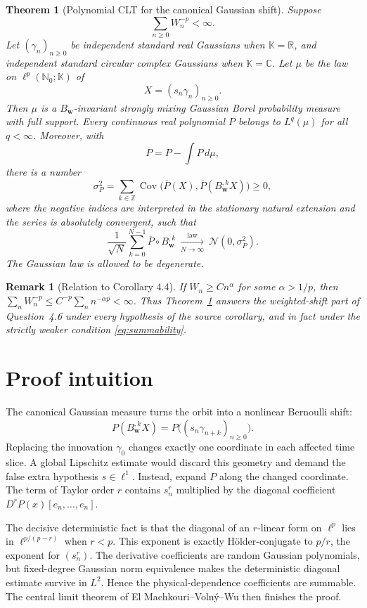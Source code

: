 \documentclass[11pt]{article}
\newtheorem{theorem}{Theorem}
\newtheorem{remark}{Remark}
\newcommand{\N}{\mathbb N}
\newcommand{\R}{\mathbb R}
\newcommand{\K}{\mathbb K}
\newcommand{\ellp}{\ell^p(\N_0;\K)}
\begin{document}
\begin{theorem}[Polynomial CLT for the canonical Gaussian shift]\label{thm:main}
Suppose
\begin{equation}\label{eq:summability}
 \sum_{n\ge0} W_n^{-p}<\infty.
\end{equation}
Let $(\gamma_n)_{n\ge0}$ be independent standard real Gaussians when $\K=\R$, and independent standard circular complex Gaussians when $\K=\mathbb C$.  Let $\mu$ be the law on $\ellp$ of
\[
 X=(s_n\gamma_n)_{n\ge0}.
\]
Then $\mu$ is a $B_{\mathbf w}$-invariant strongly mixing Gaussian Borel probability measure with full support.  Every continuous real polynomial $P$ belongs to $L^q(\mu)$ for all $q<\infty$.  Moreover, with
\[
 \overline P=P-\int P\,d\mu,
\]
there is a number
\[
 \sigma_P^2=\sum_{k\in\mathbb Z}\operatorname{Cov}
 \bigl(\overline P(X),\overline P(B_{\mathbf w}^{,k}X)\bigr)\ge0,
\]
where the negative indices are interpreted in the stationary natural extension and the series is absolutely convergent, such that
\[
 \frac1{\sqrt N}\sum_{k=0}^{N-1}\overline P\circ B_{\mathbf w}^{,k}
 \ \xrightarrow[N\to\infty]{\mathrm{law}}\ \mathcal N(0,\sigma_P^2).
\]
The Gaussian law is allowed to be degenerate.
\end{theorem}

\begin{remark}[Relation to Corollary 4.4]
If $W_n\ge Cn^\alpha$ for some $\alpha>1/p$, then
$\sum_nW_n^{-p}\le C^{-p}\sum_n n^{-\alpha p}<\infty$.  Thus Theorem~\ref{thm:main} answers the weighted-shift part of Question~4.6 under every hypothesis of the source corollary, and in fact under the strictly weaker condition \eqref{eq:summability}.
\end{remark}

\section{Proof intuition}

The canonical Gaussian measure turns the orbit into a nonlinear Bernoulli shift:
\[
 P(B_{\mathbf w}^{,k}X)=P\bigl((s_n\gamma_{n+k})_{n\ge0}\bigr).
\]
Replacing the innovation $\gamma_0$ changes exactly one coordinate in each affected time slice.  A global Lipschitz estimate would discard this geometry and demand the false extra hypothesis $s\in\ell^1$.  Instead, expand $P$ along the changed coordinate.  The term of Taylor order $r$ contains $s_n^r$ multiplied by the diagonal coefficient $D^rP(x)[e_n,\ldots,e_n]$.

The decisive deterministic fact is that the diagonal of an $r$-linear form on $\ell^p$ lies in $\ell^{p/(p-r)}$ when $r<p$.  This exponent is exactly H\"older-conjugate to $p/r$, the exponent for $(s_n^r)$.  The derivative coefficients are random Gaussian polynomials, but fixed-degree Gaussian norm equivalence makes the deterministic diagonal estimate survive in $L^2$.  Hence the physical-dependence coefficients are summable.  The central limit theorem of El Machkouri--Voln\'y--Wu \cite{EMVW} then finishes the proof.
\end{document}
